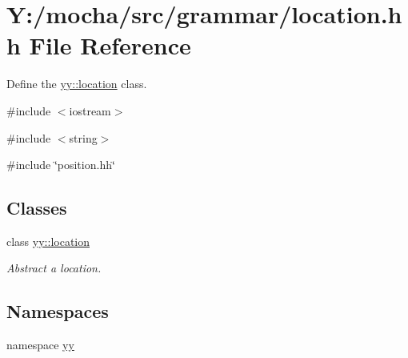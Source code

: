 \hypertarget{location_8hh}{
\section{Y:/mocha/src/grammar/location.hh File Reference}
\label{location_8hh}
}


Define the \hyperlink{classyy_1_1location}{yy::location} class.  


{\ttfamily \#include $<$iostream$>$}\par
{\ttfamily \#include $<$string$>$}\par
{\ttfamily \#include \char`\"{}position.hh\char`\"{}}\par
\subsection*{Classes}
\begin{DoxyCompactItemize}
\item 
class \hyperlink{classyy_1_1location}{yy::location}
\begin{DoxyCompactList}\small\item\em Abstract a location. \end{DoxyCompactList}\end{DoxyCompactItemize}
\subsection*{Namespaces}
\begin{DoxyCompactItemize}
\item 
namespace \hyperlink{namespaceyy}{yy}
\end{DoxyCompactItemize}
